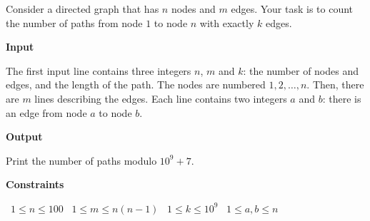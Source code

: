 Consider a directed graph that has $n$ nodes and $m$ edges. Your task is to count the number of paths from node $1$ to node $n$ with exactly $k$ edges.

\vspace{0.3cm}\noindent\textbf{Input}

The first input line contains three integers $n$, $m$ and $k$: the number of nodes and edges, and the length of the path. The nodes are numbered $1,2,\dots,n$.
Then, there are $m$ lines describing the edges. Each line contains two integers $a$ and $b$: there is an edge from node $a$ to node $b$.

\vspace{0.3cm}\noindent\textbf{Output}

Print the number of paths modulo $10^9+7$.

\vspace{0.3cm}\noindent\textbf{Constraints}

\textbullet\ $1 \le n \le 100$
\textbullet\ $1 \le m \le n(n-1)$
\textbullet\ $1 \le k \le 10^9$
\textbullet\ $1 \le a,b \le n$